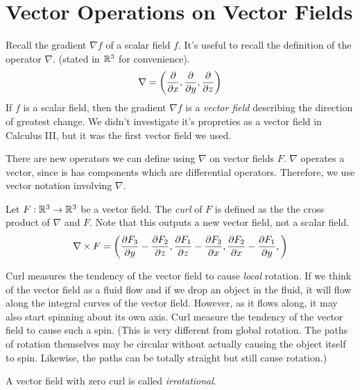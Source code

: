 \documentclass[fleqn,letterpaper]{report}
\begin{document}
\section{Vector Operations on Vector Fields}
\label{vector-operations}

Recall the gradient $\nabla f$ of a scalar field $f$. It's
useful to recall the definition of the operator $\nabla$. 
(stated in $\mathbb{R}^3$ for convenience).
\begin{equation*}
\nabla = \left( \frac{\partial}{\partial x}, \frac{\partial}{\partial y},
\frac{\partial}{\partial z} \right)
\end{equation*}
If $f$ is a scalar field, then the gradient $\nabla f$ is a
\emph{vector field} describing the direction of greatest
change. We didn't investigate it's propreties as a vector
field in Calculus III, but it was the first vector field we
used.

There are new operators we can define using $\nabla$
on vector fields $F$. $\nabla$ operates a vector,
since is has components which are differential
operators. Therefore, we use vector notation involving
$\nabla$.

\begin{defn}
Let $F : \mathbb{R}^3 \rightarrow \mathbb{R}^3$ be a vector field. The
\emph{curl} of $F$ is defined as the
the cross product of $\nabla$ and $F$. Note that this outputs
a new vector field, not a scalar field.
\begin{equation*}
\nabla \times F = \left( 
\frac{\partial F_3}{\partial y} - \frac{\partial F_2}{\partial z}, 
\frac{\partial F_1}{\partial z} - \frac{\partial F_3}{\partial x}, 
\frac{\partial F_2}{\partial x} - \frac{\partial F_1}{\partial y}, 
\right) 
\end{equation*}
\end{defn}

Curl measures the tendency of the vector field
to cause \emph{local} rotation. If we think of the
vector field as a fluid flow and if we drop an object in the
fluid, it will flow along the integral curves of the vector
field. However, as it flows along, it may also start spinning
about its own axis. Curl measure the tendency of the vector
field to cause such a spin. (This is very different from
global rotation. The paths of rotation themselves may be
circular without actually causing the object itself to spin.
Likewise, the paths can be totally straight but still cause
rotation.) 

\begin{defn}
A vector field with zero curl is called \emph{irrotational}.
\end{defn}
\end{document}
